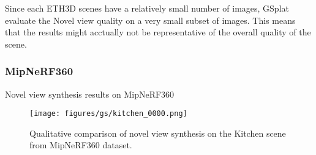 
Since each ETH3D scenes have a relatively small number of images, GSplat evaluate the Novel view quality on a very small subset of images.
This means that the results might acctually not be representative of the overall quality of the scene.

\subsubsection{MipNeRF360}\label{sec:gs-evaluation-results-mipnerf360}
Novel view synthesis results on MipNeRF360



\begin{figure}
    \centering
    \texttt{[image: figures/gs/kitchen\_0000.png]}
    \caption{Qualitative comparison of novel view synthesis on the Kitchen scene from MipNeRF360 dataset.}
\end{figure}



